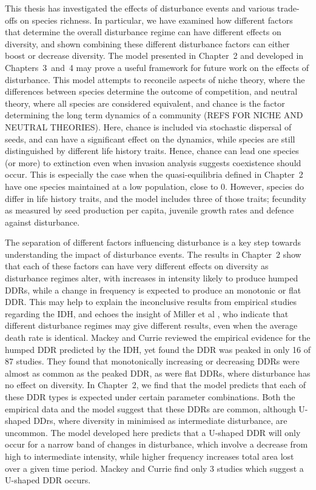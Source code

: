 This thesis has investigated the effects of disturbance events and various trade-offs on species richness. In particular, we have examined  how different factors that determine the overall disturbance regime can have different effects on diversity, and shown combining these different disturbance factors can either boost or decrease diversity. The model presented in Chapter~2 and developed in Chapters~3~and~4 may prove a useful framework for future work on the effects of disturbance. This model attempts to reconcile aspects of niche theory, where the differences between species determine the outcome of competition, and neutral theory, where all species are considered equivalent, and chance is the factor determining the long term dynamics of a community (REFS FOR NICHE AND NEUTRAL THEORIES). Here, chance is included via stochastic dispersal of seeds, and can have a significant effect on the dynamics, while species are still distinguished by different life history traits. Hence, chance can lead one species (or more) to extinction even when invasion analysis suggests coexistence should occur. This is especially the case when the quasi-equilibria defined in Chapter~2 have one species maintained at a low population, close to 0. However, species do differ in life history traits, and the model includes three of those traits; fecundity as measured by seed production per capita, juvenile growth rates and defence against disturbance.

The separation of different factors influencing disturbance is a key step towards understanding the impact of disturbance events. The results in Chapter~2 show that each of these factors can have very different effects on diversity as disturbance regimes alter, with increases in intensity likely to produce humped DDRs, while a change in frequency is expected to produce an monotonic or flat DDR. This may help to explain the inconclusive results from empirical studies regarding the IDH, and echoes the insight of Miller et al \cite{miller2011frequency}, who indicate that different disturbance regimes may give different results, even when the average death rate is identical. Mackey and Currie \cite{mackey2001diversity} reviewed the empirical evidence for the humped DDR predicted by the IDH, yet found the DDR was peaked in only 16 of 87 studies. They found that monotonically increasing or decreasing DDRs were almost as common as the peaked DDR, as were flat DDRs, where disturbance has no effect on diversity. In Chapter~2, we find that the model predicts that each of these DDR types is expected under certain parameter combinations. Both the empirical data and the model suggest that these DDRs are common, although U-shaped DDrs, where diversity in minimised as intermediate disturbance, are uncommon. The model developed here predicts that a U-shaped DDR will only occur for a narrow band of changes in disturbance, which involve a decrease from high to intermediate intensity, while higher frequency increases total area lost over a given time period. Mackey and Currie find only 3 studies which suggest a U-shaped DDR occurs.

